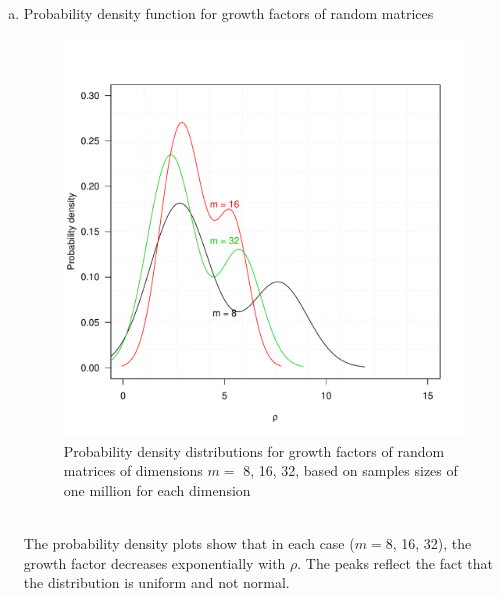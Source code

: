 \documentclass[11pt]{article}
\newcommand{\note}[1]{{\leavevmode\color{BrickRed}{#1}}}
\begin{document}
\begin{enumerate}[(a)]
\pagebreak
\item Probability density function for growth factors of random matrices
\begin{figure}[htbp]
  \begin{center}
  \includegraphics[scale =.8]{probability_density_function.pdf}
  \caption{Probability density distributions for growth factors of random matrices of dimensions  $m =$ 8, 16, 32, based on samples sizes of one million for each dimension} \label{fig:22.2} 
  \end{center}
  \end{figure}\\
  The probability density plots show that in each case ($m =$8, 16, 32), the growth factor decreases exponentially with $\rho$. The peaks reflect the fact that the distribution is uniform and not normal.\note{This graph doesn't look right. You shouldn't be getting bimodal distributions.}

\pagebreak


\end{enumerate}
\end{document}
